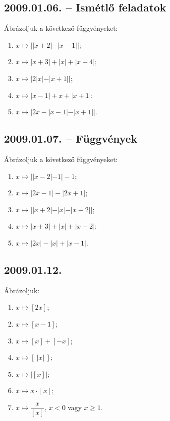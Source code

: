 \subsection*{2009.01.06. -- Ismétlő feladatok}
Ábrázoljuk a következő függvényeket:
\begin{enumerate}
\item $x\mapsto ||x+2|-|x-1||$;
\item $x\mapsto |x+3|+|x|+|x-4|$;
\item $x\mapsto |2|x|-|x+1||$;
\item $x\mapsto |x-1|+x+|x+1|$;
\item $x\mapsto |2x-|x-1|-|x+1||$.
\end{enumerate}


\subsection*{2009.01.07. -- Függvények}
Ábrázoljuk a következő függvényeket:
\begin{enumerate}
\item $x\mapsto ||x-2|-1|-1$;
\item $x\mapsto |2x-1|-|2x+1|$;
\item $x\mapsto ||x+2|-|x|-|x-2||$;
\item $x\mapsto |x+3|+|x|+|x-2|$;
\item $x\mapsto |2x|-|x|+|x-1|$.
\end{enumerate}


\subsection*{2009.01.12.}
Ábrázoljuk:
\begin{enumerate}
\item $x\mapsto [2x]$;
\item $x\mapsto [x-1]$;
\item $x\mapsto [x]+[-x]$;
\item $x\mapsto [~|x|~]$;
\item $x\mapsto \big|[x]\big|$;
\item $x\mapsto x\cdot [x]$;
\item $x\mapsto \dfrac{x}{[x]}$, $x<0$ vagy $x\ge 1$.
\end{enumerate}


